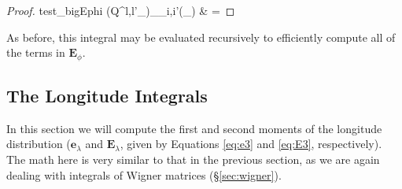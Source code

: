\documentclass[modern]{aastex62}
\begin{document}
%
\begin{proof}{test_bigEphi}
    \label{eq:Qlphiij}
    {({Q^{l,l'}_\phi})_{}}_{i,i'}(\pmb{\theta}_{\phi})
    & =
\end{proof}
%
As before, this integral may be evaluated recursively to efficiently compute all
of the terms in $\mathbf{E}_\phi$.


\subsection{The Longitude Integrals}
\label{sec:lon}

In this section we will compute the first and second moments
of the longitude distribution
($\mathbf{e}_\lambda$ and $\mathbf{E}_\lambda$, given by Equations
\ref{eq:e3} and \ref{eq:E3}, respectively). The math here is
very similar to that in the previous section, as we are again
dealing with integrals of Wigner matrices (\S\ref{sec:wigner}).
\end{document}
